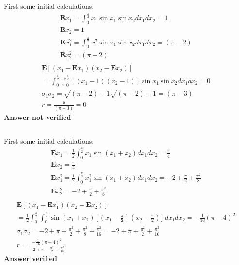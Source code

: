 \subsection{}
First some initial calculations:
\begin{eqnarray}
	\textbf{E}x_1 = \int_0^{\frac{\pi}{2}} x_1 \sin x_1 \sin x_2 dx_1dx_2 = 1 \\
	\textbf{E}x_2 = 1 \\
	\textbf{E}x_1^2 = \int_0^{\frac{\pi}{2}} x_1^2 \sin x_1 \sin x_2 dx_1dx_2 = (\pi - 2) \\
	\textbf{E}x_2^2 = (\pi - 2) \\
\end{eqnarray}
\begin{eqnarray}
	\textbf{E} \left[ (x_1 - \textbf{E}x_1)(x_2 - \textbf{E}x_2)  \right] \\
	= \int_0^{\frac{\pi}{2}} \int_0^{\frac{\pi}{2}} \left[(x_1 - 1)(x_2 - 1)\right]\sin x_1 \sin x_2 dx_1dx_2 = 0 \\
	\sigma_1 \sigma_2 =  \sqrt{(\pi - 2)- 1}\sqrt{(\pi - 2) - 1} = (\pi - 3) \\
	r= \frac{0}{(\pi - 3)} = 0
\end{eqnarray}
\textbf{Answer not verified}

\subsection{}
First some initial calculations:
\begin{eqnarray}
	\textbf{E}x_1 = \frac{1}{2}\int_0^{\frac{\pi}{2}} x_1 \sin (x_1 + x_2) dx_1dx_2 = \frac{\pi}{4} \\
	\textbf{E}x_2 = \frac{\pi}{4} \\
	\textbf{E}x_1^2 = \frac{1}{2}\int_0^{\frac{\pi}{2}} x_1^2 \sin (x_1 + x_2) dx_1dx_2 = -2+\frac{\pi}{2} +\frac{\pi ^2}{8} \\
	\textbf{E}x_2^2 = -2+\frac{\pi}{2} +\frac{\pi ^2}{8} \\
\end{eqnarray}
\begin{eqnarray}
	\textbf{E} \left[ (x_1 - \textbf{E}x_1)(x_2 - \textbf{E}x_2)  \right] \\
	= \frac{1}{2}\int_0^{\frac{\pi}{2}} \int_0^{\frac{\pi}{2}} \sin (x_1 + x_2) \left[(x_1 - \frac{\pi}{2})(x_2 - \frac{\pi}{2})\right]dx_1dx_2  = -\frac{1}{16} (\pi -4)^2 \\
	\sigma_1\sigma_2 = -2+\pi +\frac{\pi ^2}{2} +\frac{\pi^2}{8} - \frac{\pi^2}{16} = -2+\pi +\frac{\pi ^2}{2} +\frac{\pi^2}{16} \\
	r = \frac{-\frac{1}{16} (\pi -4)^2}{-2+\pi +\frac{\pi ^2}{2} +\frac{\pi^2}{16}}
\end{eqnarray}
\textbf{Answer verified}

